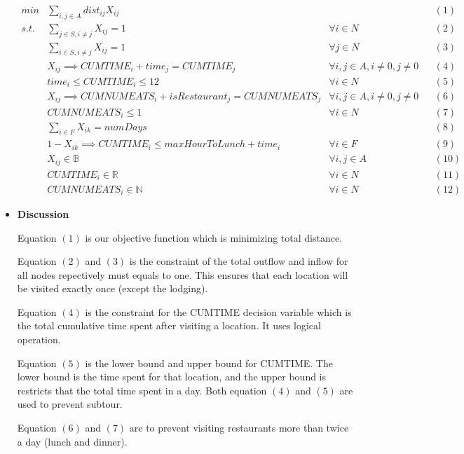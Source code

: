 \documentclass{article}
\begin{document}
\begin{itemize}
		\[
		\begin{aligned}
			min & \sum_{i, j \in A} dist_{ij}X_{ij} & & & (1) \\
			s.t. & \sum_{j \in S, i \ne j} X_{ij} = 1 & \forall i \in N & & (2) \\
			& \sum_{i \in S, i \ne j} X_{ij} = 1 & \forall j \in N & & (3) \\
			& X_{ij} \implies CUMTIME_{i} + time_{j} = CUMTIME_{j} & \forall i, j \in A, i \ne 0, j \ne 0 & & (4) \\
			& time_{i} \le CUMTIME_{i} \le 12 & \forall i \in N & & (5) \\
			& X_{ij} \implies CUMNUMEATS_{i} + isRestaurant_{j} = CUMNUMEATS_{j} & \forall i, j \in A, i \ne 0, j \ne 0 & & (6) \\
			& CUMNUMEATS_{i} \le 1 & \forall i \in N & & (7) \\
			& \sum_{i \in F} X_{ik} = numDays & & & (8) \\
			& 1 - X_{ik} \implies CUMTIME_{i} \le maxHourToLunch + time_{i} & \forall i \in F & & (9) \\
			& X_{ij} \in \mathbb{B} & \forall i, j \in A & & (10) \\
			& CUMTIME_{i} \in \mathbb{R} & \forall i \in N& & (11) \\
			& CUMNUMEATS_{i} \in \mathbb{N} & \forall i \in N& & (12)
		\end{aligned}
		\]
		
		\item \textbf{Discussion}
		
		Equation $(1)$ is our objective function which is minimizing total distance.
		
		Equation $(2)$ and $(3)$ is the constraint of the total outflow and inflow for all nodes  repectively must equals to one. This ensures that each location will be visited exactly once (except the lodging).
		
		Equation $(4)$ is the constraint for the CUMTIME decision variable which is the total cumulative time spent after visiting a location. It uses logical operation.
		
		Equation $(5)$ is the lower bound and upper bound for CUMTIME. The lower bound is the time spent for that location, and the upper bound is restricts that the total time spent in a day. Both equation $(4)$ and $(5)$ are used to prevent subtour.
		
		Equation $(6)$ and $(7)$ are to prevent visiting restaurants more than twice a day (lunch and dinner).
		

\end{itemize}
\end{document}
